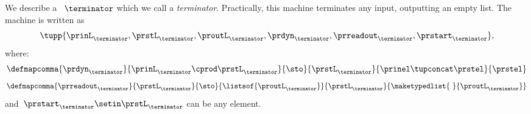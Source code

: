 {\begin{example}[Terminator]
    We describe a ~$\terminator$ which we call a \emph{terminator}.
    Practically, this machine terminates any input, outputting an empty list.
    The machine is written as
    \begin{equation}
        \tupp{\prinL_{\terminator},\prstL_{\terminator},\proutL_{\terminator},\prdyn_{\terminator},\prreadout_{\terminator},\prstart_{\terminator}},
    \end{equation}
    where:
    \begin{equation}
        \defmapcomma{\prdyn_\terminator}
        {\prinL_\terminator \cprod \prstL_\terminator}
        {\sto}
        {\prstL_\terminator}
        {\prinel \tupconcat \prstel}
        {\prstel}
    \end{equation}
    \begin{equation}
        \defmapcomma{\prreadout_\terminator}
        {\prstL_\terminator}
        {\sto}
        {\listsof{\proutL_\terminator}}
        {\prstL_\terminator}
        {
            \maketypedlist{ \ }{\proutL_\terminator}
        }
    \end{equation}
    and~$\prstart_\terminator \setin \prstL_\terminator$ can be any element.
\end{example}

}


